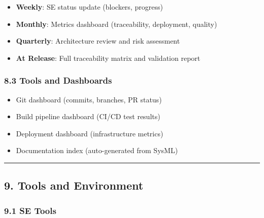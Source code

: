 \documentclass[12pt]{article}
\providecommand{\tightlist}{%
  \setlength{\itemsep}{0pt}\setlength{\parskip}{0pt}}
\begin{document}
\begin{itemize}
\tightlist
\item
  \textbf{Weekly}: SE status update (blockers, progress)
\item
  \textbf{Monthly}: Metrics dashboard (traceability, deployment,
  quality)
\item
  \textbf{Quarterly}: Architecture review and risk assessment
\item
  \textbf{At Release}: Full traceability matrix and validation report
\end{itemize}

\subsubsection{8.3 Tools and Dashboards}\label{tools-and-dashboards}

\begin{itemize}
\tightlist
\item
  Git dashboard (commits, branches, PR status)
\item
  Build pipeline dashboard (CI/CD test results)
\item
  Deployment dashboard (infrastructure metrics)
\item
  Documentation index (auto-generated from SysML)
\end{itemize}

\begin{center}\rule{0.5\linewidth}{0.5pt}\end{center}

\subsection{9. Tools and Environment}\label{tools-and-environment}

\subsubsection{9.1 SE Tools}\label{se-tools}
\end{document}
